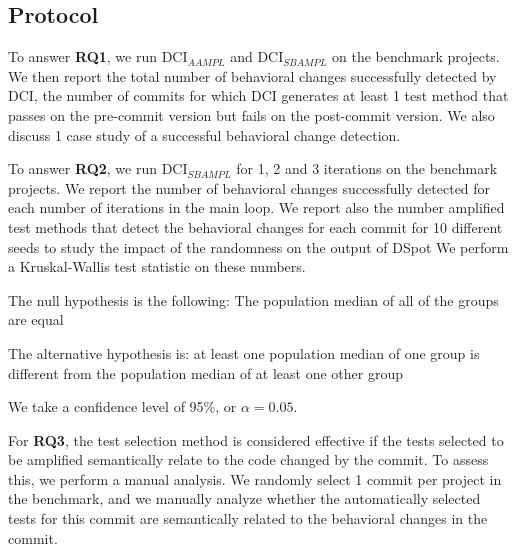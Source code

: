 \subsection{Protocol}
\label{subsec:protocol}


To answer \textbf{RQ1}, we run DCI$_{AAMPL}$ and DCI$_{SBAMPL}$ on the benchmark projects.
We then report the total number of behavioral changes successfully detected by DCI, \ie the number of commits for which DCI generates at least 1 test method that passes on the pre-commit version but fails on the post-commit version.
We also discuss 1 case study of a successful behavioral change detection.

To answer \textbf{RQ2}, we run DCI$_{SBAMPL}$ for 1, 2 and 3 iterations on the benchmark projects.
We report the number of behavioral changes successfully detected for each number of iterations in the main loop.
We report also the number amplified test methods that detect the behavioral changes for each commit for 10 different seeds to study the impact of the randomness on the output of DSpot
We perform a Kruskal-Wallis test statistic on these numbers.

The null hypothesis is the following: The population median of all of the groups are equal

The alternative hypothesis is: at least one population median of one group is different from the population median of at least one other group

We take a confidence level of 95\%, or $\alpha = 0.05$.

For \textbf{RQ3}, the test selection method is considered effective if the tests selected to be amplified semantically relate to the code changed by the commit. 
To assess this, we perform a manual analysis.%
We randomly select 1 commit per project in the benchmark, and we manually analyze whether the automatically selected tests for this commit are semantically related to the behavioral changes in the commit. 

